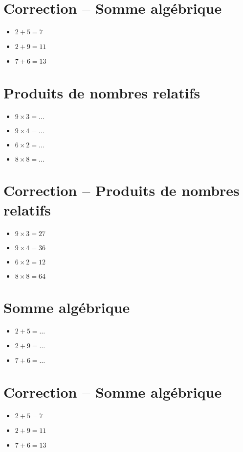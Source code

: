 \documentclass[a4paper,11pt,fleqn]{article}
\begin{document}
\section{Correction -- Somme algébrique}
\begin{itemize}

  \item $2+5=7$
  \item $2+9=11$
  \item $7+6=13$
\end{itemize}

\section{Produits de nombres relatifs}
\begin{itemize}

  \item $9\times3=\ldots$
  \item $9\times4=\ldots$
  \item $6\times2=\ldots$
  \item $8\times8=\ldots$
\end{itemize}

\section{Correction -- Produits de nombres relatifs}
\begin{itemize}

  \item $9\times3=27$
  \item $9\times4=36$
  \item $6\times2=12$
  \item $8\times8=64$
\end{itemize}
\newpage
\setcounter{exo}{0}
\setcounter{section}{0}
\section{Somme algébrique}
\begin{itemize}

3
3
3
3
3
3
3
3
3
3
  \item $2+5=\ldots$
  \item $2+9=\ldots$
  \item $7+6=\ldots$
\end{itemize}

\section{Correction -- Somme algébrique}
\begin{itemize}

  \item $2+5=7$
  \item $2+9=11$
  \item $7+6=13$
\end{itemize}
\end{document}
